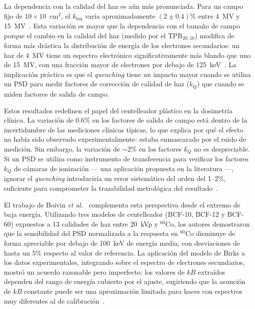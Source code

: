 \documentclass[11pt,a4paper]{article}
\begin{document}
La dependencia con la calidad del haz es aún más pronunciada. Para un campo fijo de $10 \times 10$~cm$^{2}$, el $k_{\mathrm{ioq}}$ varía aproximadamente $(2 \pm 0{.}4)$\% entre 4~MV y 15~MV~\cite{santurio2019}. Esta variación es mayor que la dependencia con el tamaño de campo porque el cambio en la calidad del haz (medido por el TPR$_{20,10}$) modifica de forma más drástica la distribución de energía de los electrones secundarios: un haz de 4~MV tiene un espectro electrónico significativamente más blando que uno de 15~MV, con una fracción mayor de electrones por debajo de 125~keV~\cite{santurio2019}. La implicación práctica es que el \textit{quenching} tiene un impacto mayor cuando se utiliza un PSD para medir factores de corrección de calidad de haz ($k_{Q}$) que cuando se miden factores de salida de campo.

Estos resultados redefinen el papel del centelleador plástico en la dosimetría clínica. La variación de 0.6\% en los factores de salida de campo está dentro de la incertidumbre de las mediciones clínicas típicas, lo que explica por qué el efecto no había sido observado experimentalmente: estaba enmascarado por el ruido de medición. Sin embargo, la variación de $\sim$2\% en los factores $k_{Q}$ no es despreciable. Si un PSD se utiliza como instrumento de transferencia para verificar los factores $k_{Q}$ de cámaras de ionización --- una aplicación propuesta en la literatura ---, ignorar el \textit{quenching} introduciría un error sistemático del orden del 1--2\%, suficiente para comprometer la trazabilidad metrológica del resultado~\cite{santurio2019}.

El trabajo de Boivin \textit{et al.}~\cite{boivin2016} complementa esta perspectiva desde el extremo de baja energía. Utilizando tres modelos de centelleador (BCF-10, BCF-12 y BCF-60) expuestos a 13 calidades de haz entre 20~kVp y $^{60}$Co, los autores demostraron que la sensibilidad del PSD normalizada a la respuesta en $^{60}$Co disminuye de forma apreciable por debajo de 100~keV de energía media, con desviaciones de hasta un 5\% respecto al valor de referencia. La aplicación del modelo de Birks a los datos experimentales, integrando sobre el espectro de electrones secundarios, mostró un acuerdo razonable pero imperfecto: los valores de $kB$ extraídos dependen del rango de energía cubierto por el ajuste, sugiriendo que la asunción de $kB$ constante puede ser una aproximación limitada para haces con espectros muy diferentes al de calibración~\cite{boivin2016}.
\end{document}
